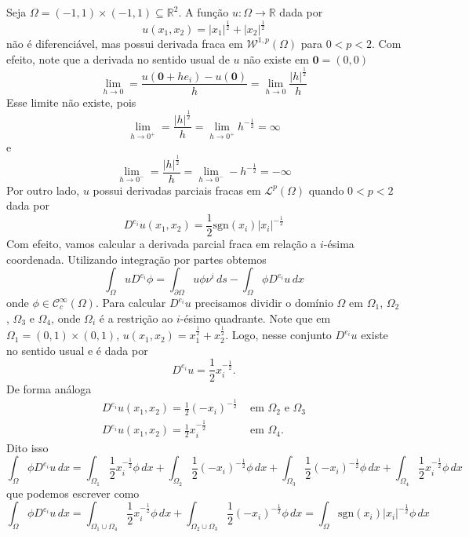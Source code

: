 \documentclass[a4paper, 11pt]{book}
\theoremstyle{definition}
\newcommand{\bR}{\mathbb{R}}
\newcommand{\cC}{\mathcal{C}}
\newcommand{\cL}{\mathcal{L}}
\newcommand{\cW}{\mathcal{W}}
\newcommand{\sgn}{\mathrm{sgn}}
\begin{document}
\begin{ex}
    Seja $\Omega = (-1,1) \times (-1,1) \subseteq \bR^2$. A função $u : \Omega \to \bR$ dada por
    \[
        u(x_1,x_2) = |x_1|^{\frac{1}{2}} + |x_2|^{\frac{1}{2}}
    \]
    não é diferenciável, mas possui derivada fraca em $\cW^{1,p}(\Omega)$ para $0 < p < 2$. Com efeito, note que a derivada no sentido usual de $u$ não existe em $\mathbf{0} = (0,0)$
    \[
        \lim_{h \to 0} = \frac{u(\mathbf{0} + he_i) - u(\mathbf{0})}{h} = \lim_{h \to 0} \frac{|h|^{\frac{1}{2}}}{h}
    \]
    Esse limite não existe, pois
    \[
        \lim_{h \to 0^+} = \frac{|h|^{\frac{1}{2}}}{h} = \lim_{h\to 0^+}h^{-\frac{1}{2}} = \infty
    \]
    e
    \[
        \lim_{h \to 0^-} = \frac{|h|^{\frac{1}{2}}}{h} = \lim_{h\to 0^-}-h^{-\frac{1}{2}} = -\infty
    \]
    Por outro lado, $u$ possui derivadas parciais fracas em $\cL^p(\Omega)$ quando $0 < p < 2$ dada por
    \[
        D^{e_i}u(x_1,x_2) = \frac{1}{2}\sgn(x_i) |x_i|^{-\frac{1}{2}}
    \]
    Com efeito, vamos calcular a derivada parcial fraca em relação a $i$-ésima coordenada. Utilizando integração por partes obtemos
    \[
        \int_\Omega u D^{e_i} \phi = \int_{\partial\Omega} u \phi \nu^i \,ds - \int_\Omega \phi D^{e_i}u \,dx
    \]
    onde $\phi \in \cC^\infty_c(\Omega)$.
    Para calcular $D^{e_i} u$ precisamos dividir o domínio $\Omega$ em $\Omega_1$, $\Omega_2$, $\Omega_3$ e $\Omega_4$, onde $\Omega_i$ é a restrição ao $i$-ésimo quadrante.
    Note que em $\Omega_1 = (0,1) \times (0,1)$, $u(x_1,x_2) = x_1^{\frac{1}{2}} + x_2^{\frac{1}{2}}$. Logo, nesse conjunto $D^{e_i} u$ existe no sentido usual e é dada por
    \[
        D^{e_i} u = \frac{1}{2} x_i^{-\frac{1}{2}}.
    \]
    De forma análoga
    \[
        \begin{array}{ll}
            D^{e_i} u(x_1,x_2) = \frac{1}{2} (-x_i)^{-\frac{1}{2}} &\text{ em } \Omega_2 \text{ e } \Omega_3 \\
            D^{e_i} u(x_1,x_2) = \frac{1}{2} x_i^{-\frac{1}{2}} &\text{ em } \Omega_4.
        \end{array}
    \]
    Dito isso
    \[
        \int_\Omega \phi D^{e_i}u \,dx = \int_{\Omega_1}  \frac{1}{2} x_i^{-\frac{1}{2}}\phi \,dx + \int_{\Omega_2} \frac{1}{2} (-x_i)^{-\frac{1}{2}} \phi \,dx + \int_{\Omega_3} \frac{1}{2} (-x_i)^{-\frac{1}{2}} \phi \,dx + \int_{\Omega_4} \frac{1}{2} x_i^{-\frac{1}{2}} \phi \,dx
    \]
    que podemos escrever como
    \[
        \int_\Omega \phi D^{e_i} u \,dx = \int_{\Omega_1 \cup \Omega_4}  \frac{1}{2} x_i^{-\frac{1}{2}}\phi \,dx + \int_{\Omega_2 \cup \Omega_3} \frac{1}{2} (-x_i)^{-\frac{1}{2}} \phi \,dx = \int_\Omega \sgn(x_i) |x_i|^{-\frac{1}{2}} \phi \,dx
\]
\end{ex}
\end{document}
